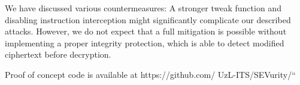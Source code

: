 We have discussed various countermeasures: A stronger tweak function and disabling instruction interception might significantly complicate our described attacks. However, we do not expect that a full mitigation is possible without implementing a proper integrity protection, which is able to detect modified ciphertext before decryption.

Proof of concept code is available at https://github.com/ UzL-ITS/SEVurity/“
